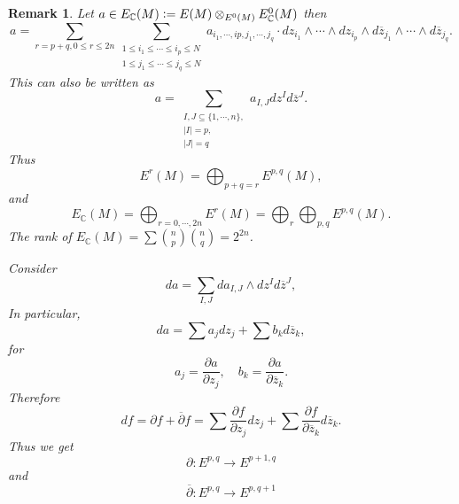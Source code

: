 \documentclass{article}
\newtheorem{remark}{Remark}[section]
\newcommand{\defeq}{\vcentcolon=}
\newcommand{\C}[0]{\mathbb{C}}
\newcommand{\pd}[2]{{\frac {\partial#1} {\partial#2}}}
\newcommand{\tens}[1]{%
  \mathbin{\mathop{\otimes}\displaylimits_{#1}}%
}
\begin{document}
\begin{remark}
  Let $a\in E_\C(M)\defeq E(M)\tens{E^0(M)}E^0_\C(M)$ then 
  \begin{equation*}
    a = \sum_{r=p+q, 0\leq r\leq 2n}\sum_{\substack{1\leq i_1\leq\cdots\leq i_p\leq N\\ 1\leq j_1\leq\cdots\leq j_q\leq N}}a_{i_1,\cdots,ip,j_1,\cdots,j_q}\cdot dz_{i_1}\wedge\cdots\wedge dz_{i_p}\wedge d\overline{z}_{j_1}\wedge\cdots\wedge d\overline{z}_{j_q}.
  \end{equation*}
  This can also be written as 
  \begin{equation*}
    a = \sum_{\substack{I,J\subseteq\{1,\cdots,n\},\\\vert I\vert = p,\\ \vert J\vert = q}}a_{I,J}dz^Id\overline{z}^J.
  \end{equation*}
  Thus 
  \begin{equation*}
    E^r(M) = \bigoplus_{p+q=r}E^{p,q}(M),
  \end{equation*}
  and
  \begin{equation*}
    E_\C(M) = \bigoplus_{r=0,\cdots,2n}E^r(M) = \bigoplus_r\bigoplus_{p,q}E^{p,q}(M).
  \end{equation*}
  The rank of $E_\C(M) = \sum{n \choose p}{n \choose q} = 2^{2n}$.
  \par Consider 
  \begin{equation*}
    da = \sum_{I,J} da_{I,J}\wedge dz^Id\overline{z}^J,
  \end{equation*}
  In particular,
  \begin{equation*}
    da = \sum a_jdz_j + \sum b_k d\overline{z}_k,
  \end{equation*}
  for 
  \begin{equation*}
    a_j = \pd{a}{z_j},\quad b_k = \pd{a}{\overline{z}_k}.
  \end{equation*}
  Therefore 
  \begin{equation*}
    df = \partial f + \overline{\partial}f = \sum \pd{f}{z_j}dz_j + \sum \pd{f}{\overline{z}_k}d\overline{z}_k.
  \end{equation*}
  Thus we get 
  \begin{equation*}
    \partial:E^{p,q}\to E^{p+1,q}
  \end{equation*}
  and 
  \begin{equation*}
    \overline{\partial}:E^{p,q}\to E^{p,q+1}
  \end{equation*}
\end{remark}
\end{document}
